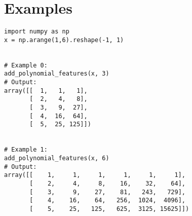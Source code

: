 \section*{Examples}
\begin{verbatim}
import numpy as np
x = np.arange(1,6).reshape(-1, 1)


# Example 0:
add_polynomial_features(x, 3)
# Output:
array([[  1,   1,   1],
       [  2,   4,   8],
       [  3,   9,  27],
       [  4,  16,  64],
       [  5,  25, 125]])


# Example 1:
add_polynomial_features(x, 6)
# Output:
array([[    1,     1,     1,     1,     1,     1],
       [    2,     4,     8,    16,    32,    64],
       [    3,     9,    27,    81,   243,   729],
       [    4,    16,    64,   256,  1024,  4096],
       [    5,    25,   125,   625,  3125, 15625]])
\end{verbatim}